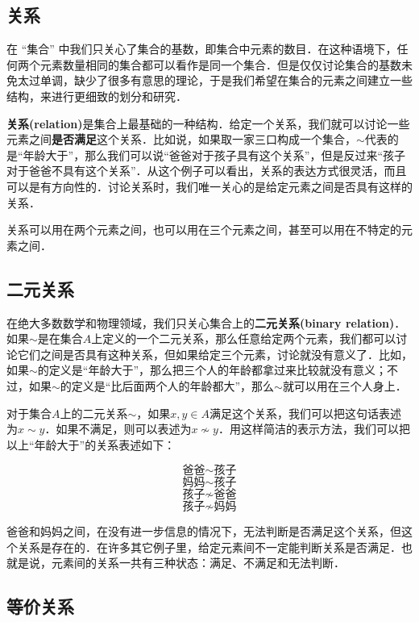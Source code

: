 
\subsection{关系}

在 “集合” 中我们只关心了集合的基数，即集合中元素的数目．在这种语境下，任何两个元素数量相同的集合都可以看作是同一个集合．但是仅仅讨论集合的基数未免太过单调，缺少了很多有意思的理论，于是我们希望在集合的元素之间建立一些结构，来进行更细致的划分和研究．

\textbf{关系(relation)}是集合上最基础的一种结构．给定一个关系，我们就可以讨论一些元素之间\textbf{是否满足}这个关系．比如说，如果取一家三口构成一个集合，$\sim$代表的是“年龄大于”，那么我们可以说“爸爸对于孩子具有这个关系”，但是反过来“孩子对于爸爸不具有这个关系”．从这个例子可以看出，关系的表达方式很灵活，而且可以是有方向性的．讨论关系时，我们唯一关心的是给定元素之间是否具有这样的关系．

关系可以用在两个元素之间，也可以用在三个元素之间，甚至可以用在不特定的元素之间．

\subsection{二元关系}

在绝大多数数学和物理领域，我们只关心集合上的\textbf{二元关系(binary relation)}．如果$\sim$是在集合$A$上定义的一个二元关系，那么任意给定两个元素，我们都可以讨论它们之间是否具有这种关系，但如果给定三个元素，讨论就没有意义了．比如，如果$\sim$的定义是“年龄大于”，那么把三个人的年龄都拿过来比较就没有意义；不过，如果$\sim$的定义是“比后面两个人的年龄都大”，那么$\sim$就可以用在三个人身上．

对于集合$A$上的二元关系$\sim$，如果$x, y\in A$满足这个关系，我们可以把这句话表述为$x\sim y$．如果不满足，则可以表述为$x\not\sim y$．用这样简洁的表示方法，我们可以把以上“年龄大于”的关系表述如下：

$$\text{爸爸}\sim\text{孩子}$$ $$\text{妈妈}\sim\text{孩子}$$ $$\text{孩子}\not\sim\text{爸爸}$$ $$\text{孩子}\not\sim\text{妈妈}$$

爸爸和妈妈之间，在没有进一步信息的情况下，无法判断是否满足这个关系，但这个关系是存在的．在许多其它例子里，给定元素间不一定能判断关系是否满足．也就是说，元素间的关系一共有三种状态：满足、不满足和无法判断．



\subsection{等价关系}

